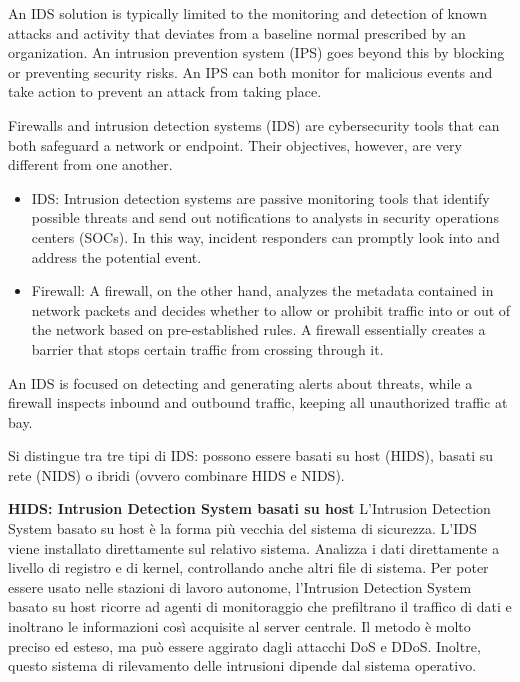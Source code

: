 An IDS solution is typically limited to the monitoring and detection of known attacks and activity that deviates from a baseline normal prescribed by an organization.
An intrusion prevention system (IPS) goes beyond this by blocking or preventing security risks. An IPS can both monitor for malicious events and take action to prevent an attack from taking place.


Firewalls and intrusion detection systems (IDS) are cybersecurity tools that can both safeguard a network or endpoint. Their objectives, however, are very different from one another.
\begin{itemize}
    \item IDS: Intrusion detection systems are passive monitoring tools that identify possible threats and send out notifications to analysts in security operations centers (SOCs). In this way, incident responders can promptly look into and address the potential event.
    \item Firewall: A firewall, on the other hand, analyzes the metadata contained in network packets and decides whether to allow or prohibit traffic into or out of the network based on pre-established rules. A firewall essentially creates a barrier that stops certain traffic from crossing through it. 
\end{itemize}
 An IDS is focused on detecting and generating alerts about threats, while a firewall inspects inbound and outbound traffic, keeping all unauthorized traffic at bay.  



Si distingue tra tre tipi di IDS: possono essere basati su host (HIDS), basati su rete (NIDS) o ibridi (ovvero combinare HIDS e NIDS).

\textbf{HIDS: Intrusion Detection System basati su host}
L’Intrusion Detection System basato su host è la forma più vecchia del sistema di sicurezza. L’IDS viene installato direttamente sul relativo sistema. Analizza i dati direttamente a livello di registro e di kernel, controllando anche altri file di sistema. Per poter essere usato nelle stazioni di lavoro autonome, l’Intrusion Detection System basato su host ricorre ad agenti di monitoraggio che prefiltrano il traffico di dati e inoltrano le informazioni così acquisite al server centrale. Il metodo è molto preciso ed esteso, ma può essere aggirato dagli attacchi DoS e DDoS. Inoltre, questo sistema di rilevamento delle intrusioni dipende dal sistema operativo.

